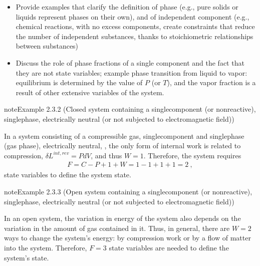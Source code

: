 \documentclass[letterpaper,10pt,english]{jupyterBook}
\begin{document}
\sphinxAtStartPar
{}
\begin{itemize}
\item {} 
\sphinxAtStartPar
Provide examples that clarify the definition of phase (e.g., pure solids or liquids represent phases on their own), and of independent component (e.g., chemical reactions, with no excess components, create constraints that reduce the number of independent substances, thanks to stoichiometric relationships between substances)

\item {} 
\sphinxAtStartPar
Discuss the role of phase fractions of a single component and the fact that they are not state variables; example phase transition from liquid to vapor: equilibrium is determined by the value of \(P\) (or \(T\)), and the vapor fraction is a result of other extensive variables of the system.

\end{itemize}
\label{ch/principles-gibbs-phase-rule:example-5}
\begin{sphinxadmonition}{note}{Example 2.3.2 (Closed system containing a single\sphinxhyphen{}component (or non\sphinxhyphen{}reactive), single\sphinxhyphen{}phase, electrically neutral (or not subjected to electromagnetic field))}



\sphinxAtStartPar
In a system consisting of a compressible gas, single\sphinxhyphen{}component and single\sphinxhyphen{}phase (gas phase), electrically neutral,  , the only form of internal work is related to compression, \(\delta L^{int,rev} = P dV\), and thus \(W = 1\). Therefore, the system requires
\begin{equation*}
\begin{split}F = C - P + 1 + W = 1 - 1 + 1 + 1 = 2 \ ,\end{split}
\end{equation*}
\sphinxAtStartPar
state variables to define the system state.
\end{sphinxadmonition}
\label{ch/principles-gibbs-phase-rule:example-6}
\begin{sphinxadmonition}{note}{Example 2.3.3 (Open system containing a single\sphinxhyphen{}component (or non\sphinxhyphen{}reactive), single\sphinxhyphen{}phase, electrically neutral (or not subjected to electromagnetic field))}



\sphinxAtStartPar
In an open system, the variation in energy of the system also depends on the variation in the amount of gas contained in it. Thus, in general, there are \(W = 2\) ways to change the system’s energy: by compression work or by a flow of matter into the system. Therefore, \(F=3\) state variables are needed to define the system’s state.
\end{sphinxadmonition}
\end{document}

